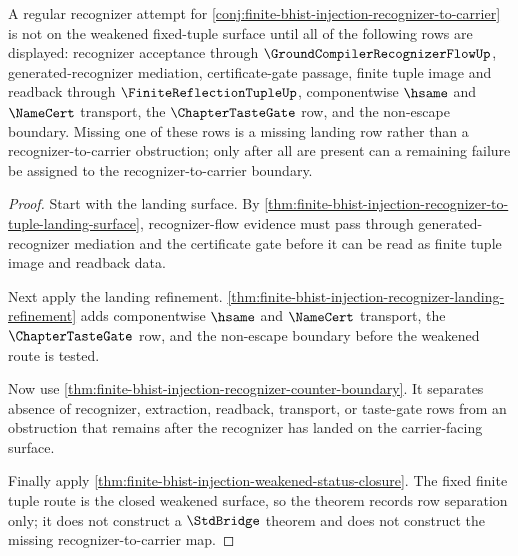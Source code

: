 \begin{theorem}
\label{thm:finite-bhist-injection-regular-recognizer-row-separation}
A regular recognizer attempt for \autoref{conj:finite-bhist-injection-recognizer-to-carrier} is not on the weakened fixed-tuple surface until all of the following rows are displayed: recognizer acceptance through $\GroundCompilerRecognizerFlowUp$, generated-recognizer mediation, certificate-gate passage, finite tuple image and readback through $\FiniteReflectionTupleUp$, componentwise $\hsame$ and $\NameCert$ transport, the $\ChapterTasteGate$ row, and the non-escape boundary. Missing one of these rows is a missing landing row rather than a recognizer-to-carrier obstruction; only after all are present can a remaining failure be assigned to the recognizer-to-carrier boundary.
\end{theorem}
\begin{proof}
Start with the landing surface. By \autoref{thm:finite-bhist-injection-recognizer-to-tuple-landing-surface}, recognizer-flow evidence must pass through generated-recognizer mediation and the certificate gate before it can be read as finite tuple image and readback data.

Next apply the landing refinement. \autoref{thm:finite-bhist-injection-recognizer-landing-refinement} adds componentwise $\hsame$ and $\NameCert$ transport, the $\ChapterTasteGate$ row, and the non-escape boundary before the weakened route is tested.

Now use \autoref{thm:finite-bhist-injection-recognizer-counter-boundary}. It separates absence of recognizer, extraction, readback, transport, or taste-gate rows from an obstruction that remains after the recognizer has landed on the carrier-facing surface.

Finally apply \autoref{thm:finite-bhist-injection-weakened-status-closure}. The fixed finite tuple route is the closed weakened surface, so the theorem records row separation only; it does not construct a $\StdBridge$ theorem and does not construct the missing recognizer-to-carrier map.
\end{proof}

